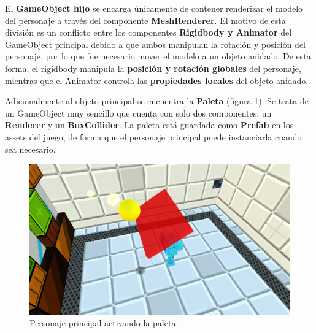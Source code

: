 El \textbf{GameObject hijo} se encarga únicamente de contener renderizar el modelo del personaje a través del componente \textbf{MeshRenderer}. El motivo de esta división es un conflicto entre los componentes \textbf{Rigidbody y Animator} del GameObject principal debido a que ambos manipulan la rotación y posición del personaje, por lo que fue necesario mover el modelo a un objeto anidado. De esta forma, el rigidbody manipula la \textbf{posición y rotación globales} del personaje, mientras que el Animator controla las \textbf{propiedades locales} del objeto anidado.

Adicionalmente al objeto principal se encuentra la \textbf{Paleta} (figura \ref{paddle}). Se trata de un GameObject muy sencillo que cuenta con solo dos componentes: un \textbf{Renderer} y un \textbf{BoxCollider}. La paleta está guardada como \textbf{Prefab} en los assets del juego, de forma que el personaje principal puede instanciarla cuando sea necesario.
\begin{figure}[!t]
	\includegraphics[width=1\textwidth]{images/estructura/personaje/flick_paddle}
	\centering
	\caption{Personaje principal activando la paleta.}
	\label{paddle}
\end{figure}

